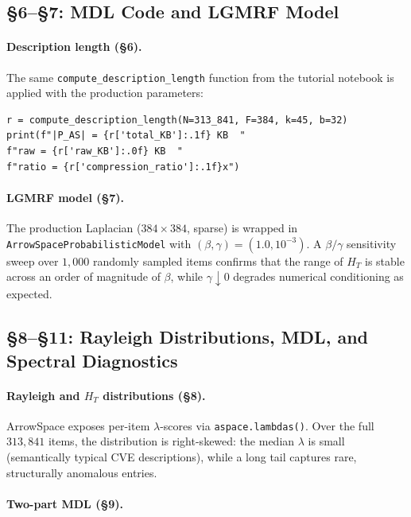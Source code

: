 \documentclass[12pt,a4paper]{article}
\theoremstyle{plain}
\theoremstyle{definition}
\theoremstyle{remark}
\newcommand{\1}{\mathbf{1}}
\begin{document}
	\subsection{§6--§7: MDL Code and LGMRF Model}
	
	\paragraph{Description length (§6).}
	The same \texttt{compute\_description\_length} function from the
	tutorial notebook is applied with the production parameters:
	
	\begin{lstlisting}[caption={Production description length: CVE corpus},
		label={lst:descprod}]
r = compute_description_length(N=313_841, F=384, k=45, b=32)
print(f"|P_AS| = {r['total_KB']:.1f} KB  "
f"raw = {r['raw_KB']:.0f} KB  "
f"ratio = {r['compression_ratio']:.1f}x")
	\end{lstlisting}
	
	\paragraph{LGMRF model (§7).}
	The production Laplacian ($384\times 384$, sparse) is wrapped in\\
	\texttt{ArrowSpaceProbabilisticModel} with $(\beta,\gamma)=(1.0,
	10^{-3})$.
	A $\beta/\gamma$ sensitivity sweep over $1{,}000$ randomly sampled
	items confirms that the range of $H_T$ is stable across an order of
	magnitude of $\beta$, while $\gamma\downarrow 0$ degrades numerical
	conditioning as expected.
	
	\subsection{§8--§11: Rayleigh Distributions, MDL, and Spectral Diagnostics}
	
	\paragraph{Rayleigh and $H_T$ distributions (§8).}
	ArrowSpace exposes per-item $\lambda$-scores via \texttt{aspace.lambdas()}.
	Over the full $313{,}841$ items, the distribution is right-skewed: the
	median $\lambda$ is small (semantically typical CVE descriptions), while
	a long tail captures rare, structurally anomalous entries.
	
	\paragraph{Two-part MDL (§9).}
	
\end{document}
